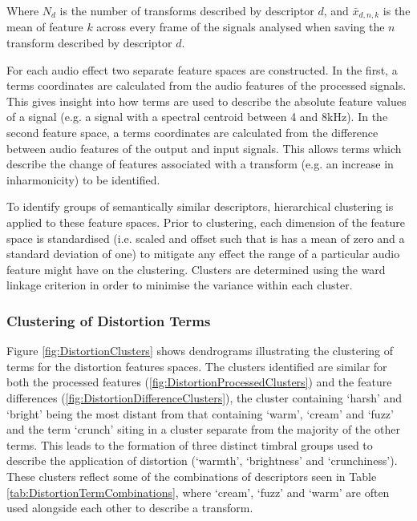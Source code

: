 		Where $N_{d}$ is the number of transforms described by descriptor $d$, and $\bar{x}_{d,n,k}$ is the mean of
		feature $k$ across every frame of the signals analysed when saving the $n$ transform described by
		descriptor $d$.
		
		For each audio effect two separate feature spaces are constructed. In the first, a terms coordinates are
		calculated from the audio features of the processed signals. This gives insight into how terms are used to
		describe the absolute feature values of a signal (e.g. a signal with a spectral centroid between 4 and
		8kHz). In the second feature space, a terms coordinates are calculated from the difference between audio
		features of the output and input signals. This allows terms which describe the change of features
		associated with a transform (e.g. an increase in inharmonicity) to be identified.

		To identify groups of semantically similar descriptors, hierarchical clustering is applied to these feature
		spaces. Prior to clustering, each dimension of the feature space is standardised (i.e. scaled and offset
		such that is has a mean of zero and a standard deviation of one) to mitigate any effect the range of a
		particular audio feature might have on the clustering. Clusters are determined using the ward linkage
		criterion \citep{ward1963hierarchical} in order to minimise the variance within each cluster.

		\subsubsection*{Clustering of Distortion Terms}
			Figure \ref{fig:DistortionClusters} shows dendrograms illustrating the clustering of terms for the
			distortion features spaces. The clusters identified are similar for both the processed features
			(\ref{fig:DistortionProcessedClusters}) and the feature differences
			(\ref{fig:DistortionDifferenceClusters}), the cluster containing `harsh' and `bright' being the
			most distant from that containing `warm', `cream' and `fuzz' and the term `crunch' siting in a
			cluster separate from the majority of the other terms. This leads to the formation of three
			distinct timbral groups used to describe the application of distortion (`warmth', `brightness' and
			`crunchiness'). These clusters reflect some of the combinations of descriptors seen in Table
			\ref{tab:DistortionTermCombinations}, where `cream', `fuzz' and `warm' are often used alongside
			each other to describe a transform.


